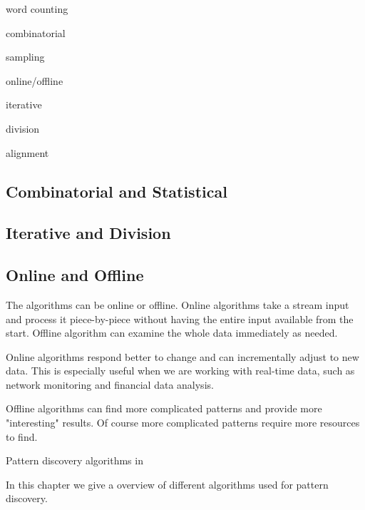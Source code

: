 word counting

combinatorial

sampling

online/offline

iterative

division

alignment



\subsection{Combinatorial and Statistical}

\subsection{Iterative and Division}

\subsection{Online and Offline}

The algorithms can be online or offline. Online algorithms take a stream input and process it piece-by-piece without having the entire input available from the start. Offline algorithm can examine the whole data immediately as needed.

Online algorithms respond better to change and can incrementally adjust to new data. This is especially useful when we are working with real-time data, such as network monitoring and financial data analysis.

Offline algorithms can find more complicated patterns and provide more "interesting" results. Of course more complicated patterns require more resources to find.

Pattern discovery algorithms in 


In this chapter we give a overview of different algorithms used for pattern discovery.


